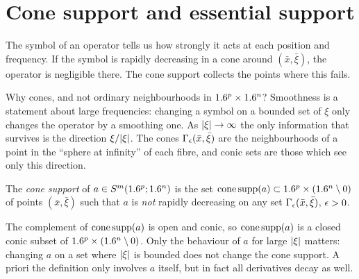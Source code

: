 \section{Cone support and essential support}\label{microlocal:sec:ess}

The symbol of an operator tells us how strongly it acts at each position and
frequency. If the symbol is rapidly decreasing in a cone around
$(\bar x,\bar\xi)$, the operator is negligible there. The cone support
collects the points where this fails.

\begin{discussion}
  Why cones, and not ordinary neighbourhoods in $1.6^p\times1.6^n$? Smoothness
  is a statement about large frequencies: changing a symbol on a bounded set of
  $\xi$ only changes the operator by a smoothing one. As $\lvert \xi\rvert\to\infty$ the
  only information that survives is the direction $\xi/\lvert \xi\rvert$. The cones
  $\Gamma_\epsilon(\bar x,\bar\xi)$ are the neighbourhoods of a point in the
  ``sphere at infinity'' of each fibre, and conic sets are those which see
  only this direction.
\end{discussion}

\begin{definition}\label{microlocal:def:conesupp}
  The \emph{cone support} of $a\in S^m(1.6^p;1.6^n)$ is the set
  $\operatorname{cone\,supp}(a)\subset1.6^p\times(1.6^n\setminus0)$ of points $(\bar x,\bar\xi)$
  such that $a$ is \emph{not} rapidly decreasing on any set
  $\Gamma_\epsilon(\bar x,\bar\xi)$, $\epsilon>0$.
\end{definition}

The complement of $\operatorname{cone\,supp}(a)$ is open and conic, so $\operatorname{cone\,supp}(a)$ is a
closed conic subset of $1.6^p\times(1.6^n\setminus0)$. Only the behaviour of
$a$ for large $\lvert \xi\rvert$ matters: changing $a$ on a set where $\lvert \xi\rvert$ is
bounded does not change the cone support. A priori the definition only
involves $a$ itself, but in fact all derivatives decay as well.

